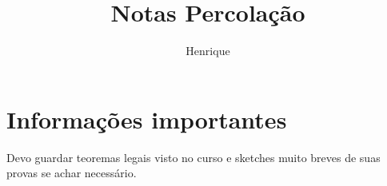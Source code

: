 \documentclass[11pt]{article}
\author{
	Henrique
}
\title{Notas Percolação}
\theoremstyle{definition}
\begin{document}
\maketitle
\date

\tableofcontents
\setcounter{section}{-1}
\section{Informações importantes}
Devo guardar teoremas legais visto no curso e sketches muito breves
de suas provas se achar necessário.















\end{document}
